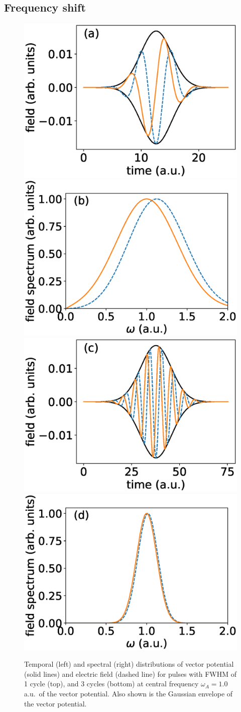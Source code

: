 \subsection{Frequency shift} %
\label{sub:frequency_shift}
\begin{figure}[h!]
\centering
   \includegraphics[width=0.35\linewidth]{figs/Frequency_shift/01_field.eps}
   \includegraphics[width=0.35\linewidth]{figs/Frequency_shift/01_spec.eps}
   \includegraphics[width=0.35\linewidth]{figs/Frequency_shift/03_field.eps}
   \includegraphics[width=0.35\linewidth]{figs/Frequency_shift/03_spec.eps}
   
\caption{Temporal (left) and spectral (right) distributions of vector potential (solid lines) and electric field (dashed line) for pulses with FWHM of 1 cycle (top), and 3 cycles (bottom) at central frequency $\omega_A = 1.0$ a.u.\  of the vector potential. Also shown is the Gaussian envelope of the vector potential. 
} 
  \label{fig:spectra}
\end{figure}

